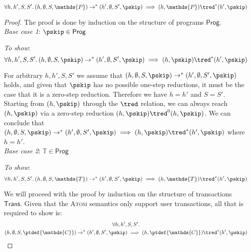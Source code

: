 \begin{thm}

\label{thm:atom}

\[
	\forall h, h', S, S' \ldotp
	(h, \emptyset, S, \mathds{P}) \rightarrow^* (h', \emptyset, S', \pskip) \implies 
	(h, \mathds{P}) \tred^* (h', \pskip)
\]

{\parindent0pt
\begin{proof}
The proof is done by induction on the structure of programs $\mathsf{Prog}$. \\

\textit{Base case 1}: $\pskip \in \mathsf{Prog}$

\textit{To show}:
\[
	\forall h, h', S, S' \ldotp
	(h, \emptyset, S, \pskip) \rightarrow^* (h', \emptyset, S', \pskip) \implies 
	(h, \pskip) \tred^* (h', \pskip)
\]

For arbitrary $h, h', S, S'$ we assume that $(h, \emptyset, S, \pskip) \rightarrow^* (h', \emptyset, S', \pskip)$ holds, and given that $\pskip$ has no possible one-step reductions, it must be the case that it is a zero-step reduction. Therefore we have $h = h'$ and $S = S'$. Starting from $(h, \pskip)$ through the $\tred$ relation, we can always reach $(h, \pskip)$ via a zero-step reduction $(h, \pskip) \tred^0 (h, \pskip)$. We can conclude that $(h, \emptyset, S, \pskip) \rightarrow^* (h', \emptyset, S', \pskip) \implies (h, \pskip) \tred^* (h', \pskip)$ where $h = h'$. \\

\textit{Base case 2}: $\mathds{T} \in \mathsf{Prog}$

\textit{To show}:
\[
	\forall h, h', S, S' \ldotp
	(h, \emptyset, S, \mathds{T}) \rightarrow^* (h', \emptyset, S', \pskip) \implies 
	(h, \mathds{T}) \tred^* (h', \pskip)
\]

We will proceed with the proof by induction on the structure of transactions $\mathsf{Trans}$. Given that the \textsc{Atom} semantics only support user transactions, all that is required to show is:
\begin{gather*}
	\forall h, h', S, S' \ldotp \\
	(h, \emptyset, S, \ptdef{\mathds{C}}) \rightarrow^* (h', \emptyset, S', \pskip) \implies 
	(h, \ptdef{\mathds{C}}) \tred^* (h', \pskip)
\end{gather*}


\end{proof}}
\end{thm}
